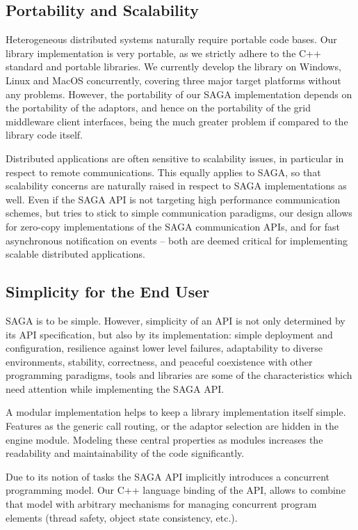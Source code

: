 \subsection{Portability and Scalability}

 Heterogeneous distributed systems naturally require por\-table code
 bases.  Our library implementation is very
 portable, as we strictly adhere to the C++ standard and portable 
 libraries.  We currently develop the library on Windows, Linux and MacOS 
 concurrently, covering three 
 major target platforms without any problems.
 However, the portability of our SAGA implementation
 depends on the portability of the adaptors, and hence on the portability 
 of the grid middleware client interfaces, being the much greater problem 
 if compared to the library code itself.

 Distributed applications are often sensitive to sca\-lability
 issues, in particular in respect to remote communications.  This equally 
 applies to SAGA, so that scalability concerns
 are naturally raised in respect to SAGA implementations as well.
 Even if the SAGA API is not targeting
 high performance communication schemes, but tries to stick to
 simple communication paradigms,
 our design allows for zero-copy implementations of the
 SAGA communication APIs, and for fast asynchronous
 notification on events -- both are deemed critical for implementing
 scalable distributed applications.  
 
\subsection{Simplicity for the End User}

 SAGA is  to be simple.  However, simplicity 
 of an API is not only determined by its API specification, but also
 by its implementation: simple deployment and configuration,
 resilience against lower level failures, adaptability to diverse
 environments, stability, correctness, and peaceful coexistence with
 other programming paradigms, tools and libraries are some of the
 characteristics which need attention while implementing the SAGA API.  
 
 A modular implementation helps to keep a library implementation itself
 simple.
 Features as the generic call routing, or the adaptor selection are hidden 
 in the engine module.
 Modeling these central properties
 as modules increases the readability and maintainability of the code
 significantly.  

 Due to its notion of tasks the SAGA API implicitly introduces a concurrent 
 programming model.
 Our C++ language binding of the API, allows to combine
 that model with arbitrary mechanisms for managing concurrent program
 elements (thread safety, object state consistency, etc.).


